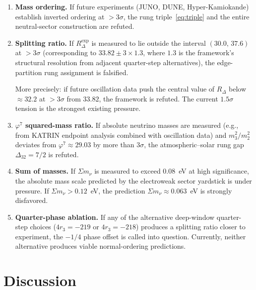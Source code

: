 \documentclass[11pt]{article}
\theoremstyle{remark}
\newcommand{\phig}{\varphi}
\newcommand{\Rdel}{R_\Delta}
\begin{document}
\begin{enumerate}
  \item \textbf{Mass ordering.}
    If future experiments (JUNO, DUNE, Hyper-Kamiokande)
    establish inverted ordering at $>3\sigma$, the rung
    triple~\eqref{eq:triple} and the entire neutral-sector
    construction are refuted.

  \item \textbf{Splitting ratio.}
    If $\Rdel^{\mathrm{exp}}$ is measured to lie outside the
    interval $(30.0,\,37.6)$ at $>3\sigma$ (corresponding to
    $33.82\pm 3\times 1.3$, where $1.3$ is the framework's
    structural resolution from adjacent quarter-step
    alternatives), the edge-partition rung assignment is
    falsified.

    More precisely: if future oscillation data push the central
    value of $\Rdel$ below $\approx 32.2$ at $>3\sigma$ from
    $33.82$, the framework is refuted.  The current $1.5\sigma$
    tension is the strongest existing pressure.

  \item \textbf{$\phig^7$ squared-mass ratio.}
    If absolute neutrino masses are measured (e.g., from
    KATRIN endpoint analysis combined with oscillation data)
    and $m_3^2/m_2^2$ deviates from $\phig^7\approx 29.03$
    by more than $3\sigma$, the atmospheric--solar rung gap
    $\Delta_{32}=7/2$ is refuted.

  \item \textbf{Sum of masses.}
    If $\Sigma m_\nu$ is measured to exceed $0.08$~eV at high
    significance, the absolute mass scale predicted by the
    electroweak sector yardstick is under pressure.  If
    $\Sigma m_\nu > 0.12$~eV, the prediction
    $\Sigma m_\nu\approx 0.063$~eV is strongly disfavored.

  \item \textbf{Quarter-phase ablation.}
    If any of the alternative deep-window quarter-step choices
    ($4r_3=-219$ or $4r_3=-218$) produces a splitting ratio
    closer to experiment, the $-1/4$ phase offset is called
    into question.  Currently, neither alternative produces
    viable normal-ordering predictions.
\end{enumerate}

\section{Discussion}
\label{sec:discussion}
\end{document}
